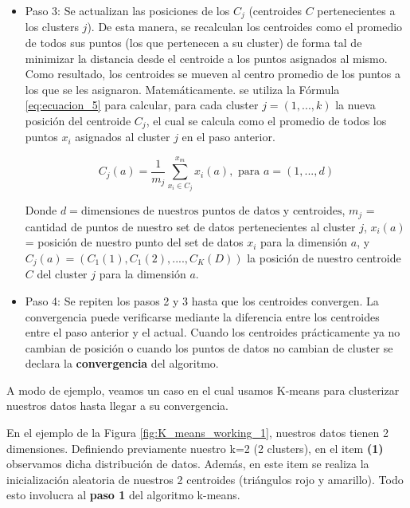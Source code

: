 \documentclass[12pt,a4paper]{article}
\begin{document}
\begin{sloppypar}
\begin{itemize}
\item Paso 3: Se actualizan las posiciones de los $C_{j}$ (centroides $C$ pertenecientes a los clusters $j$). De esta manera, se recalculan los centroides como el promedio de todos sus puntos (los que pertenecen a su cluster) de forma tal de minimizar la distancia desde el centroide a los puntos asignados al mismo. Como resultado, los centroides se mueven al centro promedio de los puntos a los que se les asignaron. Matemáticamente. se utiliza la Fórmula \ref{eq:ecuacion_5} para calcular, para cada cluster $j=(1,...,k)$ la nueva posición del centroide $C_{j}$, el cual se calcula como el promedio de todos los puntos $x_{i}$ asignados al cluster $j$ en el paso anterior.  

\begin{equation}\label{eq:ecuacion_5}
C_{j}(a)=\frac{1}{m_{j}}\sum_{x_{i} \in C_{j}}^{x_{m}}x_{i}(a),     \text{   para  } a = (1,...,d)
\end{equation}

Donde $d = \text{dimensiones de nuestros puntos de datos y centroides}$, $m_{j}$ = cantidad de puntos de nuestro set de datos pertenecientes al cluster $j$, $x_{i}(a)$ = posición de nuestro punto del set de datos $x_{i}$ para la dimensión $a$, y $C_{j}(a)= (C_{1}(1),C_{1}(2),...., C_{K}(D))$ la posición de nuestro centroide $C$ del cluster $j$ para la dimensión $a$.

\item Paso 4: Se repiten los pasos 2 y 3 hasta que los centroides convergen. La convergencia puede verificarse mediante la diferencia entre los centroides entre el paso anterior y el actual. Cuando los centroides prácticamente ya no cambian de posición o cuando los puntos de datos no cambian de cluster se declara la \textbf{convergencia} del algoritmo.\\

\end{itemize}

A modo de ejemplo, veamos un caso en el cual usamos K-means para clusterizar nuestros datos hasta llegar a su convergencia. 

En el ejemplo de la Figura \ref{fig:K_means_working_1}, nuestros datos tienen 2 dimensiones. Definiendo previamente nuestro k=2 (2 clusters), en el item \textbf{(1)} observamos dicha distribución de datos. Además, en este item se realiza la inicialización aleatoria de nuestros 2 centroides (triángulos rojo y amarillo). Todo esto involucra al \textbf{paso 1} del algoritmo k-means.  


\end{sloppypar}
\end{document}
